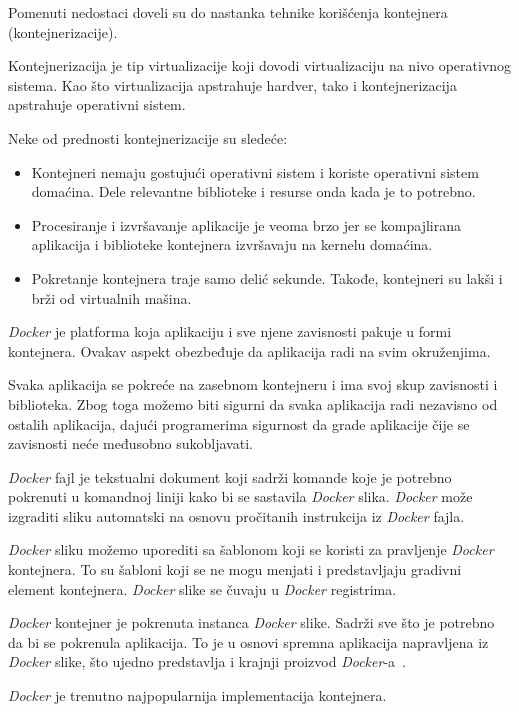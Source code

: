 Pomenuti nedostaci doveli su do nastanka tehnike korišćenja kontejnera (kontejnerizacije). 

Kontejnerizacija je tip virtualizacije koji dovodi virtualizaciju na nivo operativnog 
sistema. Kao što virtualizacija apstrahuje hardver, tako i kontejnerizacija apstrahuje 
operativni sistem.

Neke od prednosti kontejnerizacije su sledeće:
\begin{itemize}
    \item Kontejneri nemaju gostujući operativni sistem i koriste operativni sistem domaćina. 
    Dele relevantne biblioteke i resurse onda kada je to potrebno.
    \item Procesiranje i izvršavanje aplikacije je veoma brzo jer se kompajlirana aplikacija 
    i biblioteke kontejnera izvršavaju na kernelu domaćina.
    \item Pokretanje kontejnera traje samo delić sekunde. Takođe, kontejneri su lakši i brži 
    od virtualnih mašina.
\end{itemize}

\textit{Docker} je platforma koja aplikaciju i sve njene zavisnosti pakuje u formi kontejnera. 
Ovakav aspekt obezbeđuje da aplikacija radi na svim okruženjima.

Svaka aplikacija se pokreće na zasebnom kontejneru i ima svoj skup zavisnosti i biblioteka. 
Zbog toga možemo biti sigurni da svaka aplikacija radi nezavisno od ostalih aplikacija, 
dajući programerima sigurnost da grade aplikacije čije se zavisnosti neće međusobno sukobljavati.

\textit{Docker} fajl je tekstualni dokument koji sadrži komande koje je potrebno pokrenuti 
u komandnoj liniji kako bi se sastavila \textit{Docker} slika. \textit{Docker} može izgraditi sliku automatski 
na osnovu pročitanih instrukcija iz \textit{Docker} fajla.

\textit{Docker} sliku možemo uporediti sa šablonom koji se koristi za pravljenje \textit{Docker} kontejnera. 
To su šabloni koji se ne mogu menjati i predstavljaju gradivni element kontejnera.
\textit{Docker} slike se čuvaju u \textit{Docker} registrima. 

\textit{Docker} kontejner je pokrenuta instanca \textit{Docker} slike. Sadrži sve što je potrebno da bi se 
pokrenula aplikacija. To je u osnovi spremna aplikacija napravljena iz \textit{Docker} slike, 
što ujedno predstavlja i krajnji proizvod \textit{Docker}-a~\cite{docker}.

\textit{Docker} je trenutno najpopularnija implementacija kontejnera.

